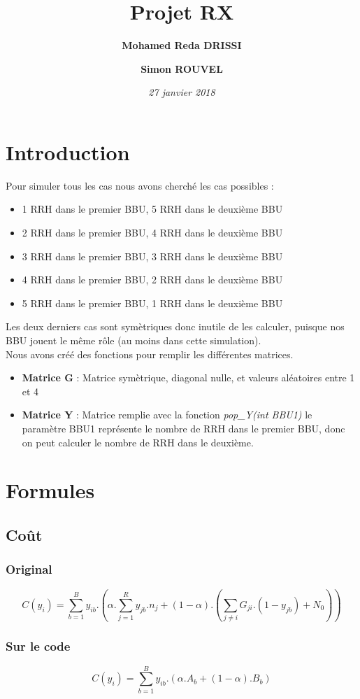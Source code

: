 \documentclass[a4paper,sans,titlepage,10pt]{article}
\title{Projet RX}
\author { \textbf{Mohamed Reda DRISSI }
			\and
		   \textbf{Simon ROUVEL}}
\date{\textit{27 janvier 2018}}
\begin{document}
\maketitle

\tableofcontents
\clearpage
\section{Introduction}
Pour simuler tous les cas nous avons cherché les cas possibles :
\begin{itemize}
	\item 1 RRH dans le premier BBU, 5 RRH dans le deuxième BBU
	\item 2 RRH dans le premier BBU, 4 RRH dans le deuxième BBU
	\item 3 RRH dans le premier BBU, 3 RRH dans le deuxième BBU
	\item 4 RRH dans le premier BBU, 2 RRH dans le deuxième BBU
	\item 5 RRH dans le premier BBU, 1 RRH dans le deuxième BBU
\end{itemize}
Les deux derniers cas sont symètriques donc inutile de les calculer, puisque nos BBU jouent
le même rôle (au moins dans cette simulation).\\
Nous avons créé des fonctions pour remplir les différentes matrices.
\begin{itemize}
	\item \textbf{Matrice G} : Matrice symètrique, diagonal nulle, et valeurs aléatoires entre 1 et 4
	\item \textbf{Matrice Y} : Matrice remplie avec la fonction \textit{pop\_Y(int BBU1)}
		le paramètre BBU1 représente le nombre de RRH dans le premier BBU, donc on peut
		calculer le nombre de RRH dans le deuxième.
\end{itemize}
\section{Formules}
\subsection{Coût}
\subsubsection{Original}
\begin{displaymath}
C(y_i)= \sum_{b=1}^By_{ib}.\left(\alpha.\sum_{j=1}^Ry_{jb}.n_j+(1-\alpha).(\sum_{j\neq i}G_{ji}.(1-y_{jb})+N_0)\right)
\end{displaymath}
\subsubsection{Sur le code}
\begin{displaymath}
C(y_i)= \sum_{b=1}^By_{ib}.(\alpha.A_b+(1-\alpha).B_b)
\end{displaymath}
\end{document}
